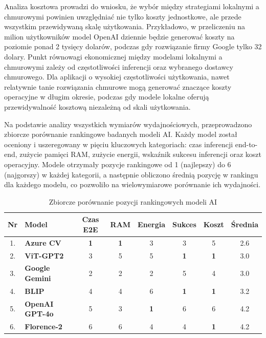 Analiza kosztowa prowadzi do wniosku, że wybór między strategiami lokalnymi a chmurowymi powinien uwzględniać nie tylko koszty jednostkowe,
ale przede wszystkim przewidywaną skalę użytkowania. Przykładowo, w przeliczeniu na milion użytkowników model OpenAI dziennie 
będzie generować koszty na poziomie ponad 2 tysięcy dolarów, podczas gdy rozwiązanie firmy Google tylko 32 dolary. Punkt równowagi ekonomicznej między modelami lokalnymi a chmurowymi zależy od częstotliwości inferencji
oraz wybranego dostawcy chmurowego. Dla aplikacji o wysokiej częstotliwości użytkowania, nawet relatywnie tanie rozwiązania chmurowe mogą generować
znaczące koszty operacyjne w długim okresie, podczas gdy modele lokalne oferują przewidywalność kosztową niezależną od skali użytkowania.

Na podstawie analizy wszystkich wymiarów wydajnościowych, przeprowadzono zbiorcze porównanie rankingowe badanych modeli AI.
Każdy model został oceniony i uszeregowany w pięciu kluczowych kategoriach: czas inferencji end-to-end, zużycie pamięci RAM, zużycie energii, wskaźnik sukcesu inferencji oraz koszt operacyjny.
Modele otrzymały pozycje rankingowe od 1 (najlepszy) do 6 (najgorszy) w każdej kategorii, a następnie obliczono średnią pozycję w rankingu dla każdego modelu, co pozwoliło na wielowymiarowe porównanie ich wydajności.

\begin{table}[!h] \centering
\caption{Zbiorcze porównanie pozycji rankingowych modeli AI}
\begin{tabular}{|c|l|c|c|c|c|c|c|} \hline
\label{tab:ranking_zbiorczy}
\textbf{Nr} & \textbf{Model} & \textbf{Czas E2E} & \textbf{RAM} & \textbf{Energia} & \textbf{Sukces} & \textbf{Koszt} & \textbf{Średnia} \\ \hline\hline
1. & \textbf{Azure CV}     & \textbf{1} & \textbf{1} & 3 & 3 & 5 & 2.6 \\ \hline
2. & \textbf{ViT-GPT2}     & 3 & 5 & 5 & \textbf{1} & \textbf{1} & 3.0 \\ \hline
3. & \textbf{Google Gemini} & 2 & 2 & 2 & 5 & 4 & 3.0 \\ \hline
4. & \textbf{BLIP}         & 4 & 4 & 6 & \textbf{1} & \textbf{1} & 3.2 \\ \hline
5. & \textbf{OpenAI GPT-4o} & 5 & 3 & \textbf{1} & 6 & 6 & 4.2 \\ \hline
6. & \textbf{Florence-2}   & 6 & 6 & 4 & 4 & \textbf{1} & 4.2 \\ \hline
\end{tabular}
\end{table}

